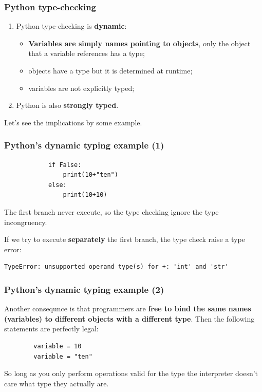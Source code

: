 \documentclass[xcolor ={table,usenames,dvipsnames}]{beamer}
\theoremstyle{definition}
\begin{document}
	\begin{frame}
		\frametitle{Python type-checking}
			\begin{enumerate}
				\item Python type-checking is \textbf{dynamic}: 
				\begin{itemize}
					\item \textbf{Variables are simply names pointing to objects}, only the object that a variable references has a type;
					\item objects have a type but it is determined at runtime;
					\item variables are not explicitly typed;
					
				\end{itemize}
				\item Python is also \textbf{strongly typed}.
			\end{enumerate}
			
			Let's see the implications by some example.
	\end{frame}

	\begin{frame}[fragile]
		\frametitle{Python's dynamic typing example (1)}
			\begin{lstlisting} 
			if False:
				print(10+"ten") 
			else:
				print(10+10)
			\end{lstlisting}
			The first branch never execute, so the type checking ignore the type incongruency.
			
			If we try to execute \textbf{separately} the first branch, the type check raise a type error:
			
			\begin{lstlisting}[keywordstyle=\color{black},
			commentstyle=\color{black},
			stringstyle=\color{black}.]
			TypeError: unsupported operand type(s) for +: 'int' and 'str'
			\end{lstlisting}
	\end{frame}

	\begin{frame}[fragile]
		\frametitle{Python's dynamic typing example (2)}
		Another consequnce is that programmers are \textbf{free to bind the same names (variables) to different objects with a different type}. Then the following statements are perfectly legal:
		
		\begin{lstlisting}
		variable = 10
		variable = "ten"
		\end{lstlisting}
		
		So long as you only perform operations valid for the type the interpreter doesn't care what type they actually are. 
	\end{frame}
\end{document}

